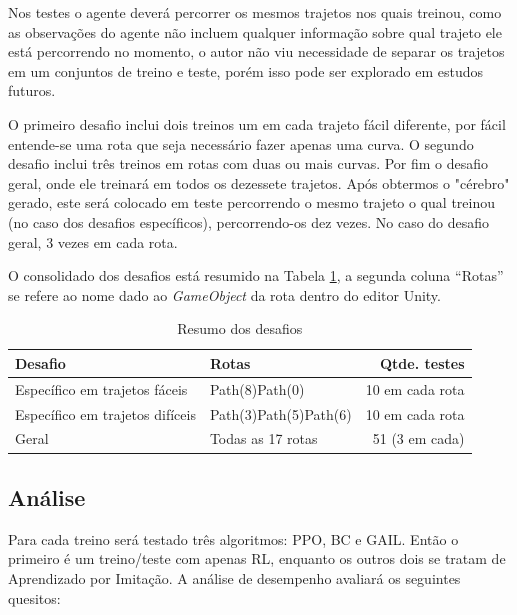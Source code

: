 Nos testes o agente deverá percorrer os mesmos trajetos nos quais treinou, como as observações do agente não incluem qualquer informação sobre qual trajeto ele está percorrendo no momento, o autor não viu necessidade de separar os trajetos em um conjuntos de treino e teste, porém isso pode ser explorado em estudos futuros. 

O primeiro desafio inclui dois treinos um em cada trajeto fácil diferente, por fácil entende-se uma rota que seja necessário fazer apenas uma curva. O segundo desafio inclui três treinos em rotas com duas ou mais curvas. Por fim o desafio geral, onde ele treinará em todos os dezessete trajetos. Após obtermos o "cérebro"{} gerado, este será colocado em teste percorrendo o mesmo trajeto o qual treinou (no caso dos desafios específicos), percorrendo-os dez vezes. No caso do desafio geral, 3 vezes em cada rota.

O consolidado dos desafios está resumido na Tabela \ref{tabela-testes}, a segunda coluna ``Rotas'' se refere ao nome dado ao \textit{GameObject} da rota dentro do editor Unity.

\begin{table}[htpb]
   \centering
   \caption{Resumo dos desafios}
   \label{tabela-testes}
   \begin{tabular}{|l|p{4cm}|r|}
        \hline
        \small{Desafio}                      & \small{Rotas}                              & \small{Qtde. testes}     \\ \hline
         Específico em trajetos fáceis       & Path(8)\newline Path(0)                    &      10 em cada rota     \\ \hline
         Específico em trajetos difíceis     & Path(3)\newline Path(5)\newline Path(6)    &      10 em cada rota     \\ \hline
         Geral                               & Todas as 17 rotas                          &      51 (3 em cada)      \\ \hline
   \end{tabular}
\end{table}

\subsection{Análise}
Para cada treino será testado três algoritmos: PPO, BC e GAIL. Então o primeiro é um treino/teste com apenas RL, enquanto os outros dois se tratam de Aprendizado por Imitação. A análise de desempenho avaliará os seguintes quesitos:

